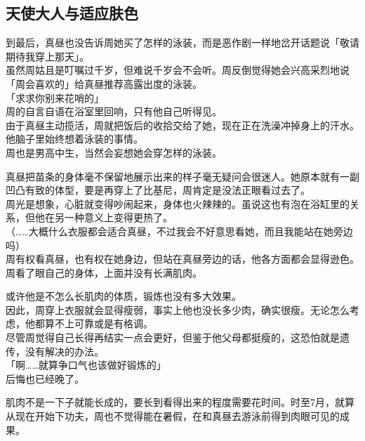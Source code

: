 \subsection{天使大人与适应肤色}

到最后，真昼也没告诉周她买了怎样的泳装，而是恶作剧一样地岔开话题说「敬请期待我穿上那天」。\\

虽然周姑且是叮嘱过千岁，但难说千岁会不会听。周反倒觉得她会兴高采烈地说「周会喜欢的」给真昼推荐高露出度的泳装。\\

「求求你别来花哨的」\\

周的自言自语在浴室里回响，只有他自己听得见。\\

由于真昼主动揽活，周就把饭后的收拾交给了她，现在正在洗澡冲掉身上的汗水。他脑子里始终想着泳装的事情。\\

周也是男高中生，当然会妄想她会穿怎样的泳装。

真昼把苗条的身体毫不保留地展示出来的样子毫无疑问会很迷人。她原本就有一副凹凸有致的体型，要是再穿上了比基尼，周肯定是没法正眼看过去了。\\

周光是想象，心脏就变得吵闹起来，身体也火辣辣的。虽说这也有泡在浴缸里的关系，但他在另一种意义上变得更热了。\\

（……大概什么衣服都会适合真昼，不过我会不好意思看她，而且我能站在她旁边吗）\\

周有权看真昼，也有权在她身边，但站在真昼旁边的话，他各方面都会显得逊色。\\

周看了眼自己的身体，上面并没有长满肌肉。

或许他是不怎么长肌肉的体质，锻炼也没有多大效果。\\

因此，周穿上衣服就会显得瘦弱，事实上他也没长多少肉，确实很瘦。无论怎么考虑，他都算不上可靠或是有格调。\\

尽管周觉得自己长得再结实一点会更好，但鉴于他父母都挺瘦的，这恐怕就是遗传，没有解决的办法。\\

「啊……就算争口气也该做好锻炼的」\\

后悔也已经晚了。

肌肉不是一下子就能长成的，要长到看得出来的程度需要花时间。时至7月，就算从现在开始下功夫，周也不觉得能在暑假，在和真昼去游泳前得到肉眼可见的成果。\\

